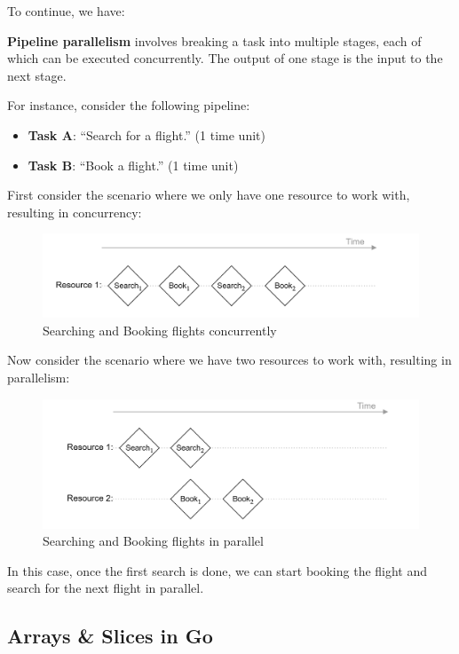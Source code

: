 \newpage 
\noindent
To continue, we have:
\begin{Def}

    \textbf{Pipeline parallelism} involves breaking a task into multiple stages, each of which can be executed concurrently. The output of one stage is the input to the next stage.
\end{Def}

For instance, consider the following pipeline:
\begin{itemize}
    \item \textbf{Task A}: ``Search for a flight.'' (1 time unit)
    \item \textbf{Task B}: ``Book a flight.'' (1 time unit)
\end{itemize}

\noindent
First consider the scenario where we only have one resource to work with, resulting in concurrency:
\begin{figure}[h]
    \centering
    \includegraphics[width=1\textwidth]{./Sections/rpc_2/ppar.png}
    \caption{Searching and Booking flights concurrently}
\end{figure}

\noindent
Now consider the scenario where we have two resources to work with, resulting in parallelism:
\begin{figure}[h]
    \centering
    \includegraphics[width=1\textwidth]{./Sections/rpc_2/ppar_2.png}
    \caption{Searching and Booking flights in parallel}
\end{figure}
\noindent
In this case, once the first search is done, we can start booking the flight and search for the next flight in parallel.
\newpage 

\subsection{Arrays \& Slices in Go}

